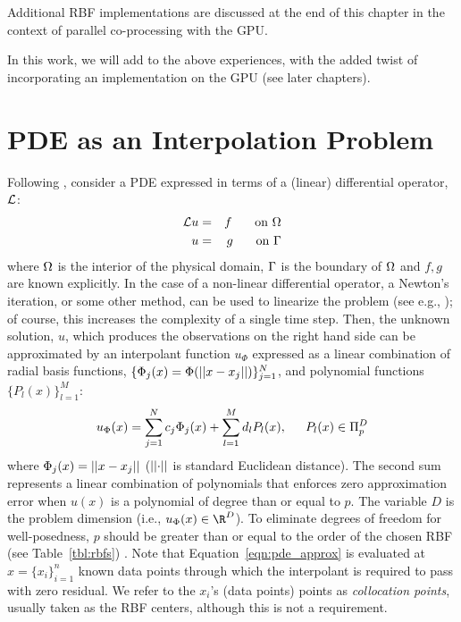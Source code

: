 \documentclass{report}
\begin{document}
{Additional RBF implementations are discussed at the end of this chapter in the context of parallel co-processing with the GPU. 

In this work, we will add to the above experiences, with the added twist of incorporating an implementation on the GPU (see later chapters). 

%



\section{PDE as an Interpolation Problem}
Following \cite{Mouat2002}, consider a PDE expressed in terms of a (linear) differential operator, $\diffop$: 
\begin{eqnarray}
\mathcal{L}u & = & f \hskip1.5em \textrm{ on } \Omega \\
u &=& g \hskip1.5em \textrm{ on } \Gamma
\end{eqnarray}
where $\Omega$ is the interior of the physical domain, $\Gamma$ is the boundary of $\Omega$ and $f,g$ are known explicitly. In the case of a non-linear differential operator, a Newton's iteration, or some other method, can be used to linearize the problem (see e.g., \cite{Wright2006}); of course, this increases the complexity of a single time step. Then, the unknown solution, $u$, which produces the observations on the right hand side can be approximated by an interpolant function $u_{\Phi}$ expressed as a linear combination of radial basis functions, $\{\Phi_j(x) = \Phi(\left|\left|x-x_j\right|\right|)\}_{j=1}^{N}$, and polynomial functions$\{P_l(x)\}_{l=1}^{M}$:
\begin{equation}
	u_{\Phi}(x) = \sum_{j=1}^{N} c_{j}  \Phi_j(x) + \sum_{l=1}^{M} d_{l} P_l(x), \hskip1.5em P_l(x) \in \Pi^{D}_{p}
	\label{eqn:pde_approx}
\end{equation}
where $\Phi_j(x) = \left|\left|x - x_j\right|\right|$ ($\left|\left|\cdot\right|\right|$ is standard Euclidean distance). The 
second sum represents a linear combination of polynomials that enforces zero approximation error
 when $u(x)$ is a polynomial of degree than or equal to $p$. The variable $D$ is the 
 problem dimension (i.e., $u_{\Phi}(x) \in \R^{D}$). 
To eliminate degrees of freedom for well-posedness, $p$ should be greater than or equal to the order of the chosen RBF
 (see Table~\ref{tbl:rbfs}) \cite{Iske:2004}.  
Note that Equation~\ref{eqn:pde_approx} is evaluated 
 at $x = \{x_i\}_{i=1}^{n}$ known 
data points through which the interpolant is required to pass with zero residual.  We refer to 
the $x_i$'s (data points) points as \emph{collocation points}, usually taken as the RBF centers, although this is not a requirement.

}
\end{document}
